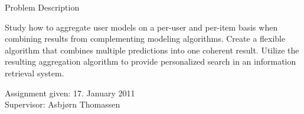 \null\vspace{13em}
{
  \centering
  \normalfont
  \huge
  Problem Description\\
}
\vspace{2em}

\noindent
Study how to aggregate user models on a per-user and per-item
basis when combining results from complementing modeling algorithms.
Create a flexible algorithm that combines multiple predictions
into one coherent result.
Utilize the resulting aggregation algorithm
to provide personalized search in an information retrieval system.

\vspace{1em}
\begin{flushleft}


  Assignment given: 17. January 2011\\
  Supervisor: Asbjørn Thomassen\\


\end{flushleft}

\cleardoublepage
